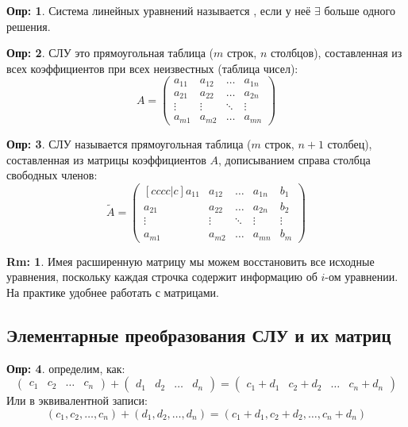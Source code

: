 \documentclass[12pt]{article}
\theoremstyle{definition}
\newtheorem{defn}{Опр:}
\newtheorem{rem}{Rm:}
\newcommand{\wte}[1]{\widetilde{#1}}
\begin{document}
\begin{defn}
	Система линейных уравнений называется , если у неё $\exists$ больше одного решения.
\end{defn}
\begin{defn}
	 СЛУ это прямоугольная таблица ($m$ строк, $n$ столбцов), составленная из всех коэффициентов при всех неизвестных (таблица чисел):
	$$
		A = 
		\begin{pmatrix}
			a_{11} & a_{12} & \dotsc & a_{1n} \\
			a_{21} & a_{22} & \dotsc & a_{2n} \\
			\vdots & \vdots & \ddots & \vdots \\
			a_{m1} & a_{m2} & \dotsc & a_{mn}
		\end{pmatrix}
	$$
\end{defn}
\begin{defn}
	 СЛУ называется прямоугольная таблица ($m$ строк, $n + 1$ столбец), составленная из матрицы коэффициентов $A$, дописыванием справа столбца свободных членов:
	$$
		\wte{A} = 
		\begin{pmatrix}[cccc|c]
			a_{11} & a_{12} & \dotsc & a_{1n} &  b_1\\
			a_{21} & a_{22} & \dotsc & a_{2n} &  b_2\\
			\vdots & \vdots & \ddots & \vdots &  \vdots \\
			a_{m1} & a_{m2} & \dotsc & a_{mn} &	b_m
		\end{pmatrix}
	$$
\end{defn}
\begin{rem}
	Имея расширенную матрицу мы можем восстановить все исходные уравнения, поскольку каждая строчка содержит информацию об $i$-ом уравнении. На практике удобнее работать с матрицами.
\end{rem}

\subsection*{Элементарные преобразования СЛУ и их матриц}

\begin{defn}
	 определим, как:
	$$
		\begin{pmatrix}
			c_1 & c_2 &\dotsc & c_n
		\end{pmatrix} + 
		\begin{pmatrix}
			d_1 & d_2 &\dotsc & d_n
		\end{pmatrix} =
		\begin{pmatrix}
			c_1 + d_1 & c_2 + d_2&\dotsc & c_n + d_n
		\end{pmatrix}
	$$
	Или в эквивалентной записи:
	$$
		(c_1, c_2,\dotsc, c_n) + (d_1,d_2, \dotsc, d_n) = (c_1 + d_1, c_2 + d_2, \dotsc , c_n + d_n)
	$$
\end{defn}
\end{document}
